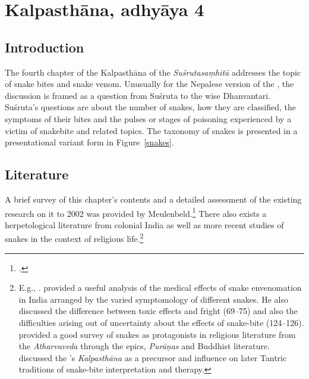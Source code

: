 \section{Kalpasthāna, adhyāya 4}

\subsection{Introduction}
The fourth chapter of the Kalpasthāna of the \emph{Suśrutasaṃhitā} addresses 
the topic of snake bites and snake venom.  Unusually for the Nepalese version of 
the \SS, the discussion is framed as a question from Suśruta to the wise 
Dhanvantari.  Suśruta's questions are about the number of snakes, how they 
are classified, the symptoms of their bites and the pulses or stages of poisoning 
experienced by a victim of snakebite and related topics.  The taxonomy of snakes 
is presented in a presentational variant form in Figure~\ref{snakes}.


    
\subsection{Literature} 

A brief survey of this chapter's contents and a detailed assessment of the
existing research on it to 2002 was provided by Meulenbeld.\footcite[IA,
292--294]{meul-hist} There also exists a herpetological literature from
colonial India as well as more recent studies of snakes in the context of
religious life.\footnote{E.g., \cite{ewar-1878, wall-1921}. 
    \citet[75--124]{wall-1913} provided a useful analysis of the medical effects
    of snake envenomation in India arranged by the varied symptomology of
    different snakes.  He also discussed the difference between toxic effects
    and fright (69--75) and also the difficulties arising out of uncertainty
    about the effects of snake-bite (124--126).  \citet{doni-2015} provided a
    good survey of snakes as protagonists in religious literature from the
    \emph{Atharvaveda} through the epics, \emph{Purāṇas} and Buddhist
    literature. \citet[31--33 \emph{et passim}]{slou-2016} discussed the \SS's
    \emph{Kalpasthāna} as a precursor and influence on later Tantric traditions
    of snake-bite interpretation and therapy. } %
    
